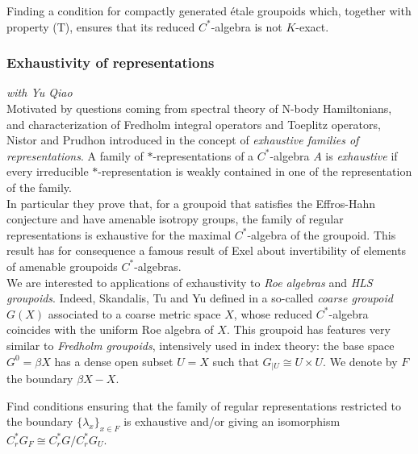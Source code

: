 \begin{project}
Finding a condition for compactly generated \'etale groupoids which, together with property (T), ensures that its reduced $C^*$-algebra is not $K$-exact. 
\end{project}

\subsubsection*{Exhaustivity of representations}

\textit{with Yu Qiao}\\

Motivated by questions coming from spectral theory of N-body Hamiltonians, and characterization of Fredholm integral operators and Toeplitz operators, Nistor and Prudhon introduced in \cite{NistorPrudhon} the concept of \textit{exhaustive families of representations}. A family of $*$-representations of a $C^*$-algebra $A$ is \textit{exhaustive} if every irreducible $*$-representation is weakly contained in one of the representation of the family.\\

In particular they prove that, for a groupoid that satisfies the Effros-Hahn conjecture and have amenable isotropy groups, the family of regular representations is exhaustive for the maximal $C^*$-algebra of the groupoid. This result has for consequence a famous result of Exel \cite{exel2014invertibility} about invertibility of elements of amenable groupoids $C^*$-algebras.\\

We are interested to applications of exhaustivity to \textit{Roe algebras} and \textit{HLS groupoids}. Indeed, Skandalis, Tu and Yu defined in \cite{SkTuYu} a so-called \textit{coarse groupoid} $G(X)$ associated to a coarse metric space $X$, whose reduced $C^*$-algebra coincides with the uniform Roe algebra of $X$. This groupoid has features very similar to \textit{Fredholm groupoids}, intensively used in index theory: the base space $G^0 = \beta X$ has a dense open subset $U=X$ such that $G_{|U}\cong U\times U$. We denote by $F$ the boundary $\beta X - X$.

\begin{project}
Find conditions ensuring that the family of regular representations restricted to the boundary $\{\lambda_x\}_{x\in F}$ is exhaustive and/or giving an isomorphism $C_r^*G_F \cong C^*_r G / C^*_r G_U$.
\end{project}
 

